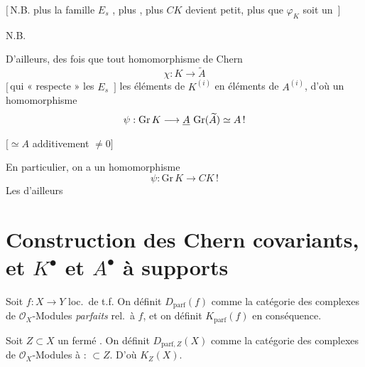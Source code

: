 \documentclass[11pt,a4paper]{article}
\begin{document}
$[\,$N.B. plus la famille \ill{} $E_{s}$ \ill{}, plus \ill{} 
\ill{}, plus $CK$ devient petit, \ill{} plus  que
$\varphi_{K}$ soit un \ill{} $\,]$


N.B. \ill{}


D'ailleurs, \ill{} \ill{}   des \ill{}
\ill{} fois que tout homomorphisme de Chern
\[
  \chi : K \longrightarrow \widetilde{A}
\]
$[\,$qui « respecte » les $E_{s}$  $\,]$
 les éléments de $K^{(i)}$ en éléments de $A^{(i)}$,
d'où un homomorphisme  
\[
  \psi : \mathrm{Gr}\,K \longrightarrow \struck{A}\ \mathrm{Gr}(\widetilde{A}) \simeq A\,!
\]
$\bigl[\simeq A$ additivement \ill{} \ill{} \ill{} $\neq 0\bigr]$

\struck{\ill{} \ill{} \ill{}}

En particulier, on a un homomorphisme
\[
  \psi : \mathrm{Gr}\,K \longrightarrow CK\,!
\]
Les \ill{} d'ailleurs

\section*{Construction des Chern covariants, et $K^{\bullet}$ et $A^{\bullet}$ à supports}



Soit $f : X \to Y$ loc.\ de t.f. On définit $D_{\mathrm{parf}}(f)$ comme la
catégorie  des complexes de $\mathcal{O}_{X}$-Modules
\emph{parfaits} rel.\ à $f$, et on définit $K_{\mathrm{parf}}(f)$ en
conséquence.

Soit $Z \subset X$ un fermé \ill{} \ill{} \ill{}. On définit
$D_{\mathrm{parf},Z}(X)$ comme la catégorie des complexes de
$\mathcal{O}_{X}$-Modules \ill{} \ill{}  à
 :  $\subset Z$. D'où \ill{}
$K_{Z}(X)$.
\end{document}
